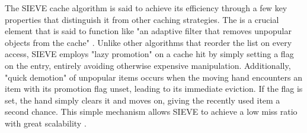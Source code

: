 

The SIEVE cache algorithm is said to achieve its efficiency through a few key properties that distinguish it from other caching strategies. The  is a crucial element that is said to function like "an adaptive filter that removes unpopular objects from the cache" \cite{sieve}. Unlike other algorithms that reorder the list on every access, SIEVE employs "lazy promotion" on a cache hit by simply setting a flag on the entry, entirely avoiding otherwise expensive manipulation. Additionally, "quick demotion" of unpopular items occurs when the moving hand encounters an item with its promotion flag unset, leading to its immediate eviction. If the flag is set, the hand simply clears it and moves on, giving the recently used item a second chance. This simple mechanism allows SIEVE to achieve a low miss ratio with great scalability \cite{sieve}.




